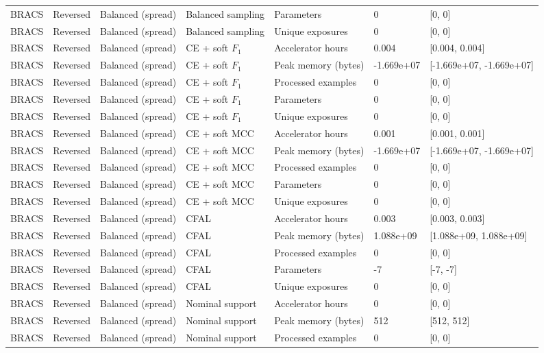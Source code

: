 \begin{longtable}{lllllll}
BRACS & Reversed & Balanced (spread) & Balanced sampling & Parameters & 0 & [0, 0] \\
BRACS & Reversed & Balanced (spread) & Balanced sampling & Unique exposures & 0 & [0, 0] \\
BRACS & Reversed & Balanced (spread) & CE + soft $F_1$ & Accelerator hours & 0.004 & [0.004, 0.004] \\
BRACS & Reversed & Balanced (spread) & CE + soft $F_1$ & Peak memory (bytes) & -1.669e+07 & [-1.669e+07, -1.669e+07] \\
BRACS & Reversed & Balanced (spread) & CE + soft $F_1$ & Processed examples & 0 & [0, 0] \\
BRACS & Reversed & Balanced (spread) & CE + soft $F_1$ & Parameters & 0 & [0, 0] \\
BRACS & Reversed & Balanced (spread) & CE + soft $F_1$ & Unique exposures & 0 & [0, 0] \\
BRACS & Reversed & Balanced (spread) & CE + soft MCC & Accelerator hours & 0.001 & [0.001, 0.001] \\
BRACS & Reversed & Balanced (spread) & CE + soft MCC & Peak memory (bytes) & -1.669e+07 & [-1.669e+07, -1.669e+07] \\
BRACS & Reversed & Balanced (spread) & CE + soft MCC & Processed examples & 0 & [0, 0] \\
BRACS & Reversed & Balanced (spread) & CE + soft MCC & Parameters & 0 & [0, 0] \\
BRACS & Reversed & Balanced (spread) & CE + soft MCC & Unique exposures & 0 & [0, 0] \\
BRACS & Reversed & Balanced (spread) & CFAL & Accelerator hours & 0.003 & [0.003, 0.003] \\
BRACS & Reversed & Balanced (spread) & CFAL & Peak memory (bytes) & 1.088e+09 & [1.088e+09, 1.088e+09] \\
BRACS & Reversed & Balanced (spread) & CFAL & Processed examples & 0 & [0, 0] \\
BRACS & Reversed & Balanced (spread) & CFAL & Parameters & -7 & [-7, -7] \\
BRACS & Reversed & Balanced (spread) & CFAL & Unique exposures & 0 & [0, 0] \\
BRACS & Reversed & Balanced (spread) & Nominal support & Accelerator hours & 0 & [0, 0] \\
BRACS & Reversed & Balanced (spread) & Nominal support & Peak memory (bytes) & 512 & [512, 512] \\
BRACS & Reversed & Balanced (spread) & Nominal support & Processed examples & 0 & [0, 0] \\

\end{longtable}
